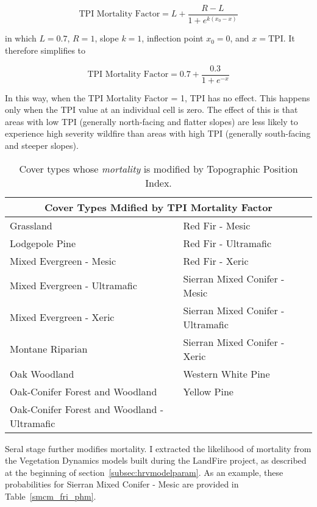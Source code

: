 \begin{itemize}
$$\text{TPI Mortality Factor} = L + \frac{R-L}{1+e^{k(x_0-x)}}$$

in which $L= 0.7$, $R=1$, slope $k=1$, inflection point $x_0=0$, and $x=\text{TPI}$. %
It therefore simplifies to 

$$\text{TPI Mortality Factor} = 0.7 + \frac{0.3}{1+e^{-x}}$$

In this way, when the TPI Mortality Factor = 1, TPI has no effect. This happens only when the TPI value at an individual cell is zero. The effect of this is that areas with low TPI (generally north-facing and flatter slopes) are less likely to experience high severity wildfire than areas with high TPI (generally south-facing and steeper slopes).

\begin{table}[htbp]
\footnotesize
\centering
\caption{Cover types whose \emph{mortality} is modified by Topographic Position Index.}
\label{covtpi_mort}
\begin{tabular}{ll}
\hline
\multicolumn{2}{c}{\textbf{Cover Types Mdified by TPI Mortality Factor}} \\
\hline
Grassland     					& Red Fir - Mesic   			\\
Lodgepole Pine    				& Red Fir - Ultramafic			\\
Mixed Evergreen - Mesic				& Red Fir - Xeric    			\\
Mixed Evergreen - Ultramafic     		& Sierran Mixed Conifer - Mesic    	\\
Mixed Evergreen - Xeric 			& Sierran Mixed Conifer - Ultramafic 	\\
Montane Riparian				& Sierran Mixed Conifer - Xeric 	\\
Oak Woodland 					& Western White Pine			\\
Oak-Conifer Forest and Woodland 		& Yellow Pine 				\\
Oak-Conifer Forest and Woodland - Ultramafic 	&					\\
\hline
\end{tabular}
\end{table}

Seral stage further modifies mortality. I extracted the likelihood of mortality from the Vegetation Dynamics models built during the LandFire project, as described at the beginning of section~\ref{subsec:hrvmodelparam}. As an example, these probabilities for Sierran Mixed Conifer - Mesic are provided in Table~\ref{smcm_fri_phm}.



\end{itemize}

